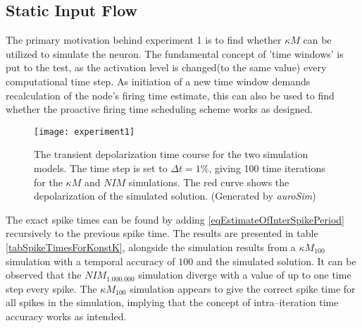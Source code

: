 		\subsection{Static Input Flow}
		The primary motivation behind experiment 1 is to find whether $\kappa M$ can be utilized to simulate the neuron.
		The fundamental concept of 'time windows' is put to the test, as the activation level is changed(to the same value) every computational time step.
		As initiation of a new time window demands recalculation of the node's firing time estimate, this can also be used to find whether the proactive firing time scheduling scheme works as designed.

\begin{figure}[hbt!p]
	\centering
	\texttt{[image: experiment1]} %
	\caption[Simulation results of experiment 1: static forcing function]{
			The transient depolarization time course for the two simulation models. The time step is set to $\Delta t = 1\%$, giving 100 time iterations for the $\kappa M$ and $NIM$ simulations. 
			The red curve shows the depolarization of the simulated solution.
			(Generated by \emph{auroSim})
			}
	\label{figExperiment1}
\end{figure}

		The exact spike times can be found by adding \eqref{eqEstimateOfInterSpikePeriod} recursively to the previous spike time.
		The results are presented in table \ref{tabSpikeTimesForKonstK}, alongside the simulation results from a $\kappa M_{100}$ simulation with a temporal accuracy of $100$ and the simulated solution.
		It can be observed that the $NIM_{1.000.000}$ simulation diverge with a value of up to one time step every spike. 
		The $\kappa M_{100}$ simulation appears to give the correct spike time for all spikes in the simulation, implying that the concept of intra--iteration time accuracy works as intended.
		
